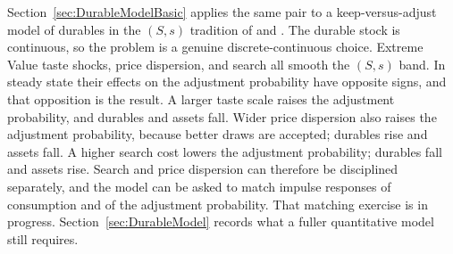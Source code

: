 Section~\ref{sec:DurableModelBasic} applies the same pair to a keep-versus-adjust
model of durables in the $(S,s)$ tradition of \citet{Carroll1997-oi} and
\citet{Berger2015-kp}. The durable stock is continuous, so the problem is a genuine
discrete-continuous choice. Extreme Value taste shocks, price dispersion, and search
all smooth the $(S,s)$ band. In steady state their effects on the adjustment
probability have opposite signs, and that opposition is the result. A larger taste
scale raises the adjustment probability, and durables and assets fall. Wider price
dispersion also raises the adjustment probability, because better draws are accepted;
durables rise and assets fall. A higher search cost lowers the adjustment probability;
durables fall and assets rise. Search and price dispersion can therefore be
disciplined separately, and the model can be asked to match impulse responses of
consumption and of the adjustment probability. That matching exercise is in
progress. Section~\ref{sec:DurableModel} records what a fuller quantitative model
still requires.

